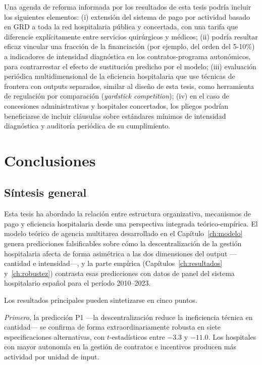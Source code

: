 \documentclass[12pt, a4paper, twoside, openright]{book}
\theoremstyle{plain}
\theoremstyle{definition}
\theoremstyle{remark}
\begin{document}
Una agenda de reforma informada por los resultados de esta tesis podría incluir los siguientes elementos: (i) extensión del sistema de pago por actividad basado en GRD a toda la red hospitalaria pública y concertada, con una tarifa que diferencie explícitamente entre servicios quirúrgicos y médicos; (ii) podría resultar eficaz vincular una fracción de la financiación (por ejemplo, del orden del 5-10\%) a indicadores de intensidad diagnóstica en los contratos-programa autonómicos, para contrarrestar el efecto de sustitución predicho por el modelo; (iii) evaluación periódica multidimensional de la eficiencia hospitalaria que use técnicas de frontera con outputs separados, similar al diseño de esta tesis, como herramienta de regulación por comparación (\textit{yardstick competition}); (iv) en el caso de concesiones administrativas y hospitales concertados, los pliegos podrían beneficiarse de incluir cláusulas sobre estándares mínimos de intensidad diagnóstica y auditoría periódica de su cumplimiento.



\chapter{Conclusiones}
\label{ch:conclusiones}

\section{Síntesis general}

Esta tesis ha abordado la relación entre estructura organizativa, mecanismos de pago y eficiencia hospitalaria desde una perspectiva integrada teórico-empírica. El modelo teórico de agencia multitarea desarrollado en el Capítulo~\ref{ch:modelo} genera predicciones falsificables sobre cómo la descentralización de la gestión hospitalaria afecta de forma asimétrica a las dos dimensiones del output ---cantidad e intensidad---, y la parte empírica (Capítulos~\ref{ch:resultados} y~\ref{ch:robustez}) contrasta esas predicciones con datos de panel del sistema hospitalario español para el período 2010--2023.

Los resultados principales pueden sintetizarse en cinco puntos.

\textit{Primero}, la predicción P1 ---la descentralización reduce la ineficiencia técnica en cantidad--- se confirma de forma extraordinariamente robusta en siete especificaciones alternativas, con $t$-estadísticos entre $-3.3$ y $-11.0$. Los hospitales con mayor autonomía en la gestión de contratos e incentivos producen más actividad por unidad de input.
\end{document}
